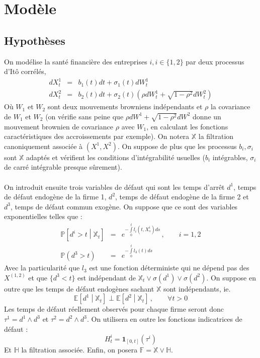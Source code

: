 \documentclass[a4paper]{article}
\theoremstyle{definition}
\theoremstyle{remark}
\begin{document}
\section{Modèle}
\subsection{Hypothèses}
On modélise la santé financière des entreprises $i, i \in \lbrace 1, 2 \rbrace$ par deux processus d'Itô corrélés, 
\begin{eqnarray}
dX^{1}_{t} &=& b_{1}(t)dt + \sigma_{1}(t)dW_{t}^{1} \\
dX^{2}_{t} &=& b_{2}(t)dt + \sigma_{2}(t)\left(\rho dW_{t}^{1} + \sqrt{1 - \rho^{2}} dW_{t}^{2}\right)
\end{eqnarray}
Où $W_{1}$ et $W_{2}$ sont deux mouvements browniens indépendants et $\rho$ la covariance de  $W_{1}$ et $W_{2}$ (on vérifie sans peine que $\rho dW^{1} + \sqrt{1 - \rho^{2}} dW^{2}$ donne un mouvement brownien de covariance $\rho$ avec $W_{1}$, en calculant les fonctions caractéristiques des accroissements par exemple). On notera $\mathbb{X}$ la filtration canoniquement associée à $(X^{1}, X^{2})$. On suppose de plus que les processus $b_{i}, \sigma_{i}$ sont $\mathbb{X}$ adaptés et vérifient les conditions d'intégrabilité usuelles ($b_{i}$ intégrables, $\sigma_{i}$ de carré intégrable presque sûrement). \\ \\
On introduit ensuite trois variables de défaut qui sont les temps d'arrêt $d^{1}$, temps de défaut endogène de la firme 1, $d^{2}$, temps de défaut endogène de la firme 2 et $d^{3}$, temps de défaut commun exogène. On suppose que ce sont des variables exponentielles telles que :
\begin{eqnarray}
\mathbb{P}\left[ d^{i} > t \middle| \mathbb{X}_{t} \right] &=& e ^{ -\int \limits_{0}^{t} l_{i} (t, X^{i}_{s})ds}\,,\qquad  i = 1, 2 \\
\mathbb{P}\left( d^{3} > t \right) &=&  e ^{ -\int \limits_{0}^{t} l_{3} (t)ds}
\end{eqnarray}
Avec la particularité que $l_{3}$ est une fonction déterministe qui ne dépend pas des $X^{(1,2)}$ et que $\lbrace d^{3} < t \rbrace$ est indépendant de $\mathbb{X}_{t} \vee \sigma(d^{1}) \vee \sigma(d^{2})$.
On suppose en outre que les temps de défaut endogènes sachant $\mathbb{X}$ sont indépendants, ie. 
\begin{equation*}
\mathbb{E} \left[d^1 \middle| \mathbb{X}_t \right] \perp \mathbb{E} \left[d^2 \middle| \mathbb{X}_t \right] \,,\qquad  \forall t > 0
\end{equation*}
Les temps de défaut réellement observés pour chaque firme seront donc $\tau^{1} = d^{1} \wedge d^{3}$ et  $\tau^{2} = d^{2} \wedge d^{3}$. On utilisera en outre les fonctions indicatrices de défaut :
\begin{equation*}
H^{i}_{t} = \mathbf{1}_{\left[0, t \right]} (\tau^{i})
\end{equation*}
Et $\mathbb{H}$ la filtration associée. Enfin, on posera $\mathbb{F} = \mathbb{X} \vee \mathbb{H}$. \\ \\
\end{document}

